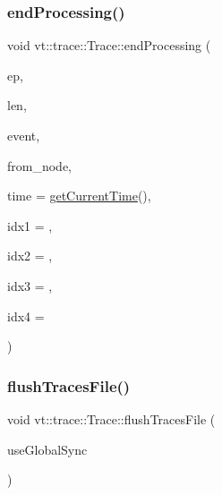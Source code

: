 \subsubsection{\texorpdfstring{end\+Processing()}{endProcessing()}\hspace{0.1cm}{\footnotesize\ttfamily [2/2]}}
{\footnotesize\ttfamily void vt\+::trace\+::\+Trace\+::end\+Processing (\begin{DoxyParamCaption}\item[{\hyperlink{namespacevt_1_1trace_a3c14050715ba9eceaeff51fb3de64f2f}{Trace\+Entry\+I\+D\+Type} const}]{ep,  }\item[{\hyperlink{namespacevt_1_1trace_aeb598f45d67d41db7902e494f2f0ce59}{Trace\+Msg\+Len\+Type} const}]{len,  }\item[{\hyperlink{namespacevt_1_1trace_a64a7185f3e102df8d8258f263ccd1582}{Trace\+Event\+I\+D\+Type} const}]{event,  }\item[{\hyperlink{namespacevt_a866da9d0efc19c0a1ce79e9e492f47e2}{Node\+Type} const}]{from\+\_\+node,  }\item[{double const}]{time = {\ttfamily \hyperlink{structvt_1_1trace_1_1_trace_a04cf6b76b4ced1bc90d246a34c948db5}{get\+Current\+Time}()},  }\item[{uint64\+\_\+t const}]{idx1 = {},  }\item[{uint64\+\_\+t const}]{idx2 = {},  }\item[{uint64\+\_\+t const}]{idx3 = {},  }\item[{uint64\+\_\+t const}]{idx4 = {} }\end{DoxyParamCaption})}

\mbox{\label{structvt_1_1trace_1_1_trace_a2e07094a48c47b9c591003f0b57305c7}} 
\subsubsection{\texorpdfstring{flush\+Traces\+File()}{flushTracesFile()}}
{\footnotesize\ttfamily void vt\+::trace\+::\+Trace\+::flush\+Traces\+File (\begin{DoxyParamCaption}\item[{bool}]{use\+Global\+Sync }\end{DoxyParamCaption})}

